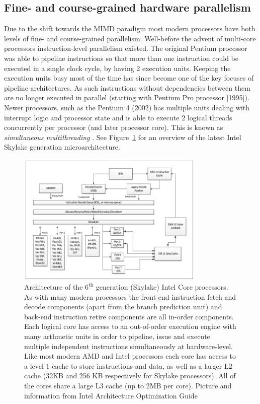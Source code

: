 \subsection{Fine- and course-grained hardware parallelism}
Due to the shift towards the MIMD paradigm most modern processors have both levels of fine- and course-grained parallelism. Well-before the advent of multi-core processors instruction-level parallelism
existed. The original Pentium processor was able to pipeline instructions so that more than one instruction could be executed in a single clock cycle, by having 2 execution units. Keeping the execution units
busy most of the time has since become one of the key focuses of pipeline architectures. As such instructions without dependencies between them are no longer executed in parallel (starting with Pentium 
Pro processor [1995]). Newer processors, such as the Pentium 4 (2002) has multiple units dealing with interrupt logic and processor state and is able to execute 2 logical threads concurrently per 
processor (and later processor core). This is known as \textit{simultaneous multithreading} \cite{gerber2002software,akhter2006multi}. See Figure~\ref{fig_cpu_arch_skylake} for an overview of the latest 
Intel Skylake generation microarchitecture.
\begin{figure}[ht!]
 \begin{mdframed}
  \centering
  \includegraphics[width=0.8\textwidth]{images/cpu_intel_skylake.png}
  \caption[Intel Skylake Generation Architecture]{Architecture of the $6^\text{th}$ generation (Skylake) Intel Core processors. As with many modern processors the front-end instruction fetch and decode components (apart from 
  the branch prediction unit) and back-end instruction retire components are all in-order components. Each logical core has access to an out-of-order execution engine with many arthmetic units in order to pipeline, issue and 
  execute multiple independent instructions simultaneously at hardware-level. Like most modern AMD and Intel processors each core has access to a level 1 cache to store instructions and data, as well as a larger L2 
  cache (32KB and 256 KB respectively for Skylake processors). All of the cores share a large L3 cache (up to 2MB per core). Picture and information from Intel Architecture Optimization Guide \cite{intelArch}}
  \label{fig_cpu_arch_skylake}
 \end{mdframed}
\end{figure}


